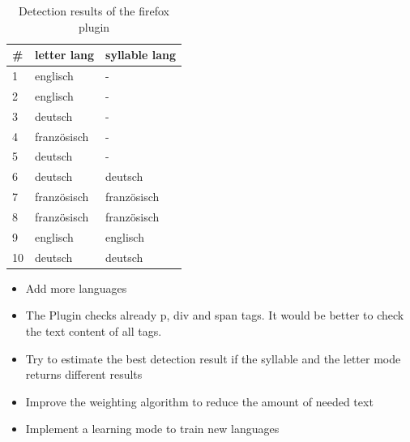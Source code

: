 \begin{frame}[c]

\begin{table}
\begin{tabular}{|l|l|l|}
\hline
\textbf{#} &\textbf{letter lang}&\textbf{syllable lang}\\
\hline
1 &englisch&-\\
2 &englisch&-\\
3&deutsch&-\\
4&französisch&-\\
5&deutsch&-\\
6&deutsch&deutsch\\
7&französisch&französisch\\
8&französisch&französisch\\
9&englisch&englisch\\
10&deutsch&deutsch\\
\hline
\end{tabular}
\caption{Detection results of the firefox plugin}
\label{tablelabel}
\end{table}

\end{frame}

\begin{frame}[c]
	
	\begin{itemize}
	\begin{itemize}
		\item Add more languages
	\end{itemize}
	
	  \begin{itemize}
  	    \item The Plugin checks already p, div and span tags. It would be better
  	  to check the text content of all tags.
  	    \item Try to estimate the best detection result if the syllable and the
  	letter mode returns different results
      \end{itemize}
      \begin{itemize}
  		\item Improve the weighting algorithm to reduce the amount of needed text
  		\item Implement a learning mode to train new languages

	\end{itemize}
	\end{itemize}
\end{frame}